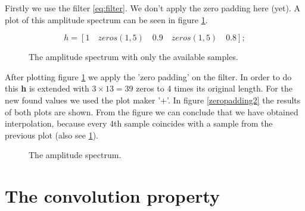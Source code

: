 \documentclass[final]{scrreprt} %
\begin{document}
Firstly we use the filter \ref{eq:filter}. 
We don't apply the zero padding here (yet). 
A plot of this amplitude spectrum can be seen in figure \ref{fig:zeropadding1}.

\begin{equation}
h = [1\quad zeros(1,5)\quad 0.9\quad zeros(1,5)\quad 0.8];
\label{eq:filter}
\end{equation}

\begin{figure}[H]
	\centering
	\setlength\figureheight{6cm}
  	\setlength\figurewidth{6cm}
	
	\caption{The amplitude spectrum with only the available samples.}
	\label{fig:zeropadding1}
\end{figure}

After plotting figure \ref{fig:zeropadding1} we apply the 'zero padding' on the filter. 
In order to do this \textbf{h} is extended with $3\times 13 = 39$ zeros to 4 times its original length.
For the new found values we used the plot maker '+'.
In figure \ref{zeropadding2} the results of both plots are shown. 
From the figure we can conclude that we have obtained interpolation, because every 4th sample coincides with a sample from the previous plot (also see \ref{fig:zeropadding1}).

\begin{figure}[H]
	\centering
	\setlength\figureheight{6cm}
  	\setlength\figurewidth{6cm}
	
	\caption{The amplitude spectrum.}
	\label{fig:zeropadding2}
\end{figure}


\section{The convolution property}
\end{document}
